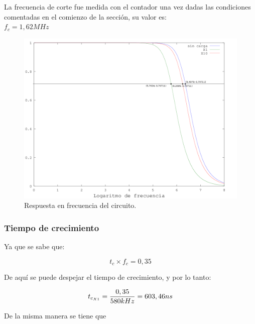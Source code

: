 \documentclass{article}
\begin{document}
	La frecuencia de corte fue medida con el contador una vez dadas las condiciones comentadas en el comienzo de la sección, su valor es:\\

$f_c = 1,62 MHz$
\bigskip



\newpage
\begin{figure}[h]
	\centering
	\includegraphics[width=1\textwidth]{images/2-respuesta-en-frecuencia.png}
	\medskip
	\caption{Respuesta en frecuencia del circuito.}
\end{figure}
\bigskip



\subsubsection{Tiempo de crecimiento}

Ya que se sabe que:

\begin{equation}
t_c \times f_c = 0,35
\end{equation}
\smallskip

De aquí se puede despejar el tiempo de crecimiento, y por lo tanto:
\smallskip

\begin{equation}
t_{c_{X1}} = {0,35 \over 580kHz} = 603,46 ns
\end{equation}
\smallskip

De la misma manera se tiene que
\smallskip
\end{document}
